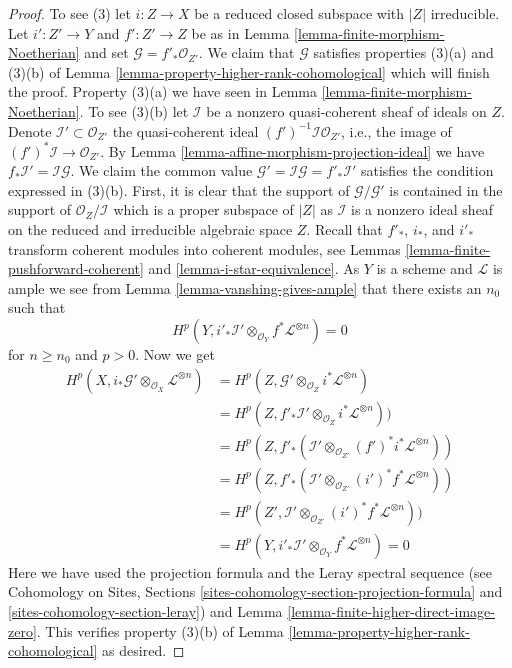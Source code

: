 \documentclass[10pt,a4paper]{amsart}
\theoremstyle{plain}
\theoremstyle{definition}
\theoremstyle{remark}
\numberwithin{equation}{subsection}
\begin{document}
\begin{proof}
\medskip\noindent
To see (3) let $i : Z \to X$ be a reduced closed subspace with $|Z|$
irreducible. Let $i' : Z' \to Y$ and $f' : Z' \to Z$ be as in
Lemma \ref{lemma-finite-morphism-Noetherian} and set
$\mathcal{G} = f'_*\mathcal{O}_{Z'}$. We claim that
$\mathcal{G}$ satisfies properties (3)(a) and (3)(b) of
Lemma \ref{lemma-property-higher-rank-cohomological}
which will finish the proof. Property (3)(a) we have seen in
Lemma \ref{lemma-finite-morphism-Noetherian}. To see (3)(b) let
$\mathcal{I}$ be a nonzero quasi-coherent sheaf of ideals on $Z$.
Denote $\mathcal{I}' \subset \mathcal{O}_{Z'}$ the quasi-coherent
ideal $(f')^{-1}\mathcal{I} \mathcal{O}_{Z'}$, i.e., the
image of $(f')^*\mathcal{I} \to \mathcal{O}_{Z'}$.
By Lemma \ref{lemma-affine-morphism-projection-ideal} we have
$f_*\mathcal{I}' = \mathcal{I} \mathcal{G}$. We claim the common value
$\mathcal{G}' = \mathcal{I} \mathcal{G} = f'_*\mathcal{I}'$
satisfies the condition expressed in (3)(b).
First, it is clear that the support of $\mathcal{G}/\mathcal{G}'$
is contained in the support of $\mathcal{O}_Z/\mathcal{I}$
which is a proper subspace of $|Z|$ as $\mathcal{I}$ is a
nonzero ideal sheaf on the reduced and irreducible algebraic space $Z$.
Recall that $f'_*$, $i_*$, and $i'_*$ transform coherent modules into
coherent modules, see Lemmas \ref{lemma-finite-pushforward-coherent} and
\ref{lemma-i-star-equivalence}.
As $Y$ is a scheme and $\mathcal{L}$ is ample
we see from Lemma \ref{lemma-vanshing-gives-ample}
that there exists an $n_0$ such that
$$
H^p(Y, i'_*\mathcal{I}' \otimes_{\mathcal{O}_Y} f^*\mathcal{L}^{\otimes n}) = 0
$$
for $n \geq n_0$ and $p > 0$. Now we get
\begin{align*}
H^p(X, i_*\mathcal{G}' \otimes_{\mathcal{O}_X} \mathcal{L}^{\otimes n})
& =
H^p(Z, \mathcal{G'} \otimes_{\mathcal{O}_Z} i^*\mathcal{L}^{\otimes n}) \\
& =
H^p(Z,
f'_*\mathcal{I}' \otimes_{\mathcal{O}_Z} i^*\mathcal{L}^{\otimes n})) \\
& =
H^p(Z, f'_*(\mathcal{I}' \otimes_{\mathcal{O}_{Z'}}
(f')^*i^*\mathcal{L}^{\otimes n})) \\
& =
H^p(Z, f'_*(\mathcal{I}' \otimes_{\mathcal{O}_{Z'}}
(i')^*f^*\mathcal{L}^{\otimes n})) \\
& =
H^p(Z',
\mathcal{I}' \otimes_{\mathcal{O}_{Z'}} (i')^*f^*\mathcal{L}^{\otimes n})) \\
& =
H^p(Y, i'_*\mathcal{I}' \otimes_{\mathcal{O}_Y} f^*\mathcal{L}^{\otimes n}) = 0
\end{align*}
Here we have used the projection formula and the Leray spectral sequence
(see Cohomology on Sites, Sections
\ref{sites-cohomology-section-projection-formula} and
\ref{sites-cohomology-section-leray})
and Lemma \ref{lemma-finite-higher-direct-image-zero}.
This verifies property (3)(b) of
Lemma \ref{lemma-property-higher-rank-cohomological} as desired.
\end{proof}
\end{document}
